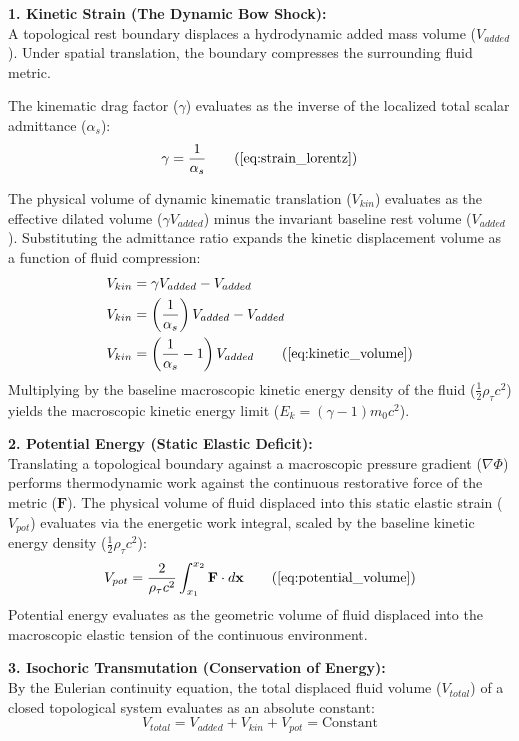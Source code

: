 \documentclass[11pt, a4paper]{article}
\begin{document}
\textbf{1. Kinetic Strain (The Dynamic Bow Shock):} \\
A topological rest boundary displaces a hydrodynamic added mass volume ($V_{added}$). Under spatial translation, the boundary compresses the surrounding fluid metric. 

The kinematic drag factor ($\gamma$) evaluates as the inverse of the localized total scalar admittance ($\alpha_s$):
\begin{equation}
    \gamma = \frac{1}{\alpha_s} \tag{\ref{eq:strain_lorentz}}
\end{equation}

The physical volume of dynamic kinematic translation ($V_{kin}$) evaluates as the effective dilated volume ($\gamma V_{added}$) minus the invariant baseline rest volume ($V_{added}$). Substituting the admittance ratio expands the kinetic displacement volume as a function of fluid compression:
\begin{align}
    V_{kin} &= \gamma V_{added} - V_{added}  \\
    V_{kin} &= \left( \frac{1}{\alpha_s} \right) V_{added} - V_{added}  \\
    V_{kin} &= \left( \frac{1}{\alpha_s} - 1 \right) V_{added} \tag{\ref{eq:kinetic_volume}}
\end{align}
Multiplying by the baseline macroscopic kinetic energy density of the fluid ($\frac{1}{2}\rho_{\tau} c^2$) yields the macroscopic kinetic energy limit ($E_k = (\gamma - 1)m_0 c^2$).

\textbf{2. Potential Energy (Static Elastic Deficit):} \\
Translating a topological boundary against a macroscopic pressure gradient ($\nabla \Phi$) performs thermodynamic work against the continuous restorative force of the metric ($\mathbf{F}$). The physical volume of fluid displaced into this static elastic strain ($V_{pot}$) evaluates via the energetic work integral, scaled by the baseline kinetic energy density ($\frac{1}{2}\rho_{\tau} c^2$):
\begin{equation}
    V_{pot} = \frac{2}{\rho_{\tau} c^2} \int_{x_1}^{x_2} \mathbf{F} \cdot d\mathbf{x} \tag{\ref{eq:potential_volume}}
\end{equation}
Potential energy evaluates as the geometric volume of fluid displaced into the macroscopic elastic tension of the continuous environment. 

\textbf{3. Isochoric Transmutation (Conservation of Energy):} \\
By the Eulerian continuity equation, the total displaced fluid volume ($V_{total}$) of a closed topological system evaluates as an absolute constant:
\begin{equation}
    V_{total} = V_{added} + V_{kin} + V_{pot} = \text{Constant} 
\end{equation}
\end{document}
